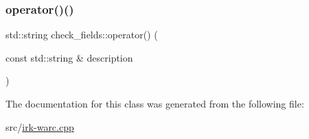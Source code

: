 \subsubsection{\texorpdfstring{operator()()}{operator()()}}
{\footnotesize\ttfamily std\+::string check\+\_\+fields\+::operator() (\begin{DoxyParamCaption}\item[{const std\+::string \&}]{description }\end{DoxyParamCaption})\hspace{0.3cm}{\ttfamily [inline]}}



The documentation for this class was generated from the following file\+:\begin{DoxyCompactItemize}
\item 
src/\mbox{\hyperlink{irk-warc_8cpp}{irk-\/warc.\+cpp}}\end{DoxyCompactItemize}
